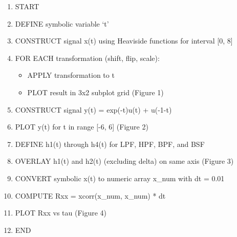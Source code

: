 \begin{enumerate}
    \item START
    \item DEFINE symbolic variable `t'
    \item CONSTRUCT signal x(t) using Heaviside functions for interval [0, 8]
    \item FOR EACH transformation (shift, flip, scale):
    \begin{itemize}
        \item APPLY transformation to t
        \item PLOT result in 3x2 subplot grid (Figure 1)
    \end{itemize}
    \item CONSTRUCT signal y(t) = exp(-t)u(t) + u(-1-t)
    \item PLOT y(t) for t in range [-6, 6] (Figure 2)
    \item DEFINE h1(t) through h4(t) for LPF, HPF, BPF, and BSF
    \item OVERLAY h1(t) and h2(t) (excluding delta) on same axis (Figure 3)
    \item CONVERT symbolic x(t) to numeric array x\_num with dt = 0.01
    \item COMPUTE Rxx = xcorr(x\_num, x\_num) * dt
    \item PLOT Rxx vs tau (Figure 4)
    \item END
\end{enumerate}